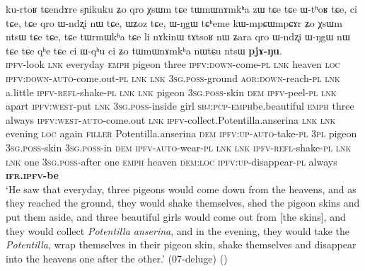 \begin{exe}
\ex \label{ex:chain.pjANu}
\gll ku-rtoʁ tɕendɤre sɲikuku ʑo qro χsɯm  tɕe tɯmɯnɤmkʰa zɯ  tɕe  tɕe ɯ-tʰoʁ  tɕe, ci  tɕe, tɕe qro ɯ-ndʐi nɯ  tɕe, ɯʑoz  tɕe, ɯ-ŋgɯ tɕʰeme kɯ-mpɕɯ\redp{}mpɕɤr ʑo χsɯm ntsɯ  tɕe  tɕe, tɕe tɯrmɯkʰa tɕe li nɤkinɯ tɤtsoʁ nɯ  ʑara qro ɯ-ndʐi ɯ-ŋgɯ nɯ  tɕe tɕe  qʰe tɕe ci ɯ-qʰu ci ʑo tɯmɯnɤmkʰa nɯtɕu  ntsɯ \textbf{pjɤ-ŋu}. \\
\textsc{ipfv}-look \textsc{lnk} everyday \textsc{emph} pigeon three \textsc{ipfv}:\textsc{down}-come-\textsc{pl} \textsc{lnk} heaven \textsc{loc} \textsc{ipfv}:\textsc{down}-\textsc{auto}-come.out-\textsc{pl} \textsc{lnk} \textsc{lnk}  \textsc{3sg}.\textsc{poss}-ground \textsc{aor}:\textsc{down}-reach-\textsc{pl} \textsc{lnk} a.little \textsc{ipfv}-\textsc{refl}-shake-\textsc{pl} \textsc{lnk} \textsc{lnk} pigeon \textsc{3sg}.\textsc{poss}-skin \textsc{dem} \textsc{ipfv}-peel-\textsc{pl} \textsc{lnk} apart \textsc{ipfv}:\textsc{west}-put \textsc{lnk} \textsc{3sg}.\textsc{poss}-inside girl \textsc{sbj}:\textsc{pcp}-\textsc{emph}\redp{}be.beautiful \textsc{emph} three always \textsc{ipfv}:\textsc{west}-\textsc{auto}-come.out \textsc{lnk} \textsc{ipfv}-collect.Potentilla.anserina \textsc{lnk} \textsc{lnk} evening \textsc{loc} again \textsc{filler} Potentilla.anserina \textsc{dem} \textsc{ipfv}:\textsc{up}-\textsc{auto}-take-\textsc{pl} \textsc{3pl} pigeon \textsc{3sg}.\textsc{poss}-skin \textsc{3sg}.\textsc{poss}-in \textsc{dem} \textsc{ipfv}-\textsc{auto}-wear-\textsc{pl} \textsc{lnk} \textsc{lnk}  \textsc{ipfv}-\textsc{refl}-shake-\textsc{pl} \textsc{lnk} \textsc{lnk} one \textsc{3sg}.\textsc{poss}-after one \textsc{emph} heaven \textsc{dem}:\textsc{loc} \textsc{ipfv}:\textsc{up}-disappear-\textsc{pl} always \textbf{\textsc{ifr}.\textsc{ipfv}-be}  \\
\glt `He saw that everyday, three pigeons would come down from the heavens, and as they reached the ground, they would shake themselves, shed the pigeon skins and put them aside, and three beautiful girls would come out from [the skins], and they would collect \textit{Potentilla anserina}, and in the evening, they would take the \textit{Potentilla}, wrap themselves in their pigeon skin, shake themselves and disappear into the heavens one after the other.' (07-deluge)
()
\end{exe}

